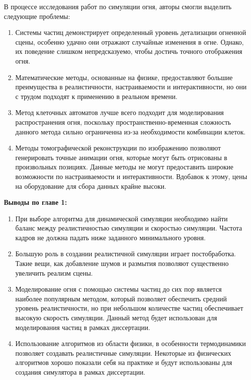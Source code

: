 В процессе исследования работ по симуляции огня, авторы смогли выделить
следующие проблемы:
\begin{enumerate}
    \item Системы частиц демонстрирует определенный уровень детализации огненной
        сцены, особенно удачно они отражают случайные изменения в огне. Однако,
        их поведение слишком непредсказуемо, чтобы достичь точного отображения
        огня.
    \item Математические методы, основанные на физике, предоставляют большие
        преимущества в реалистичности, настраиваемости и интерактивности, но они
        с трудом подходят к применению в реальном времени.
    \item Метод клеточных автоматов лучше всего подходит для моделирования
        распространения огня, поскольку пространственно-временная сложность
        данного метода сильно ограниченна из-за необходимости комбинации клеток.
    \item Методы томографической реконструкции по изображению позволяют
        генерировать точные анимации огня, которые могут быть отрисованы в
        произвольных позициях. Данные методы не могут предоставить широкие
        возможности по настраиваемости и интерактивности. Вдобавок к этому, цены
        на оборудование для сбора данных крайне высоки.
\end{enumerate}

\textbf{Выводы по главе 1:}
\begin{enumerate}
    \item При выборе алгоритма для динамической симуляции необходимо найти
        баланс между реалистичностью симуляции и скоростью симуляции. Частота
        кадров не должна падать ниже заданного минимального уровня.
    \item Большую роль в создании реалистичной симуляции играет постобработка.
        Такие вещи, как добавление шумов и размытия позволяют существенно
        увеличить реализм сцены.
    \item Моделирование огня с помощью системы частиц до сих пор является
        наиболее популярным методом, который позволяет обеспечить средний
        уровень реалистичности, но при небольшом количестве частиц обеспечивает
        высокую скорость симуляции. Данный метод будет использован для
        моделирования частиц в рамках диссертации.
    \item Использование алгоритмов из области физики, в особенности
        термодинамики позволяет создавать реалистичные симуляции. Некоторые из
        физических алгоритмов хорошо показали себя на практике и будут
        использованы для создания симулятора в рамках диссертации.
\end{enumerate}
